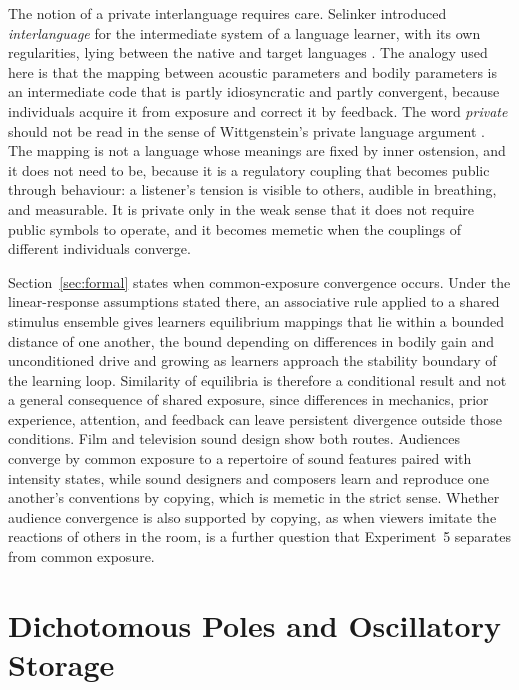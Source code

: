 \documentclass[11pt]{article}
\theoremstyle{plain}
\theoremstyle{definition}
\begin{document}
The notion of a private interlanguage requires care. Selinker introduced \textit{interlanguage} for the intermediate system of a language learner, with its own regularities, lying between the native and target languages \citep{selinker1972}. The analogy used here is that the mapping between acoustic parameters and bodily parameters is an intermediate code that is partly idiosyncratic and partly convergent, because individuals acquire it from exposure and correct it by feedback. The word \textit{private} should not be read in the sense of Wittgenstein's private language argument \citep{wittgenstein1953}. The mapping is not a language whose meanings are fixed by inner ostension, and it does not need to be, because it is a regulatory coupling that becomes public through behaviour: a listener's tension is visible to others, audible in breathing, and measurable. It is private only in the weak sense that it does not require public symbols to operate, and it becomes memetic when the couplings of different individuals converge.

Section~\ref{sec:formal} states when common-exposure convergence occurs. Under the linear-response assumptions stated there, an associative rule applied to a shared stimulus ensemble gives learners equilibrium mappings that lie within a bounded distance of one another, the bound depending on differences in bodily gain and unconditioned drive and growing as learners approach the stability boundary of the learning loop. Similarity of equilibria is therefore a conditional result and not a general consequence of shared exposure, since differences in mechanics, prior experience, attention, and feedback can leave persistent divergence outside those conditions. Film and television sound design show both routes. Audiences converge by common exposure to a repertoire of sound features paired with intensity states, while sound designers and composers learn and reproduce one another's conventions by copying, which is memetic in the strict sense. Whether audience convergence is also supported by copying, as when viewers imitate the reactions of others in the room, is a further question that Experiment~5 separates from common exposure.

\section{Dichotomous Poles and Oscillatory Storage}\label{sec:poles}
\end{document}
